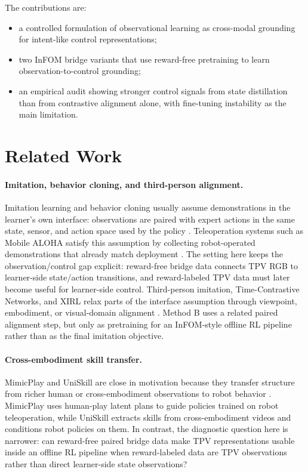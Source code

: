 \documentclass{article}
\begin{document}
The contributions are:
\begin{itemize}[leftmargin=1.5em]
    \item a controlled formulation of observational learning as cross-modal grounding for intent-like control representations;
    \item two InFOM bridge variants that use reward-free pretraining to learn observation-to-control grounding;
    \item an empirical audit showing stronger control signals from state distillation than from contrastive alignment alone, with fine-tuning instability as the main limitation.
\end{itemize}

\section{Related Work}

\paragraph{Imitation, behavior cloning, and third-person alignment.}
Imitation learning and behavior cloning usually assume demonstrations in the learner's own interface: observations are paired with expert actions in the same state, sensor, and action space used by the policy \citep{Osa2018}. Teleoperation systems such as Mobile ALOHA satisfy this assumption by collecting robot-operated demonstrations that already match deployment \citep{Fu2024MobileALOHA}. The setting here keeps the observation/control gap explicit: reward-free bridge data connects TPV RGB to learner-side state/action transitions, and reward-labeled TPV data must later become useful for learner-side control. Third-person imitation, Time-Contrastive Networks, and XIRL relax parts of the interface assumption through viewpoint, embodiment, or visual-domain alignment \citep{Stadie2017ThirdPerson,Sermanet2018TCN,Zakka2022XIRL}. Method B uses a related paired alignment step, but only as pretraining for an InFOM-style offline RL pipeline rather than as the final imitation objective.

\paragraph{Cross-embodiment skill transfer.}
MimicPlay and UniSkill are close in motivation because they transfer structure from richer human or cross-embodiment observations to robot behavior \citep{Wang2023MimicPlay,Kim2025UniSkill}. MimicPlay uses human-play latent plans to guide policies trained on robot teleoperation, while UniSkill extracts skills from cross-embodiment videos and conditions robot policies on them. In contrast, the diagnostic question here is narrower: can reward-free paired bridge data make TPV representations usable inside an offline RL pipeline when reward-labeled data are TPV observations rather than direct learner-side state observations?
\end{document}
